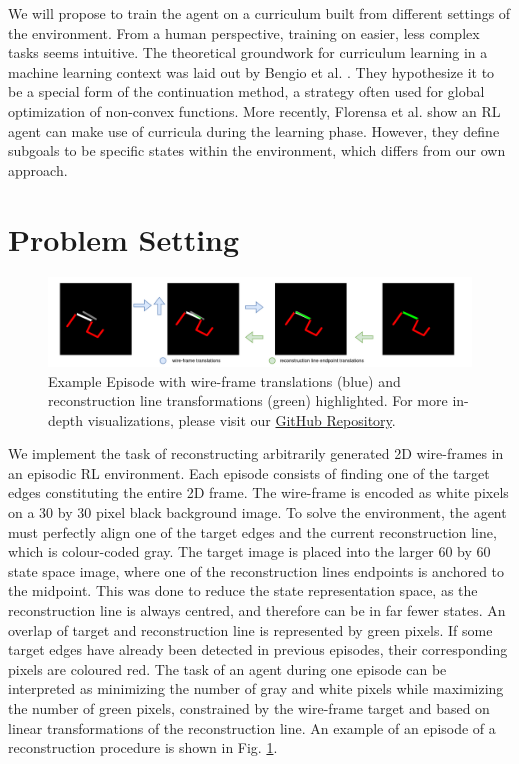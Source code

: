 \documentclass[11pt]{article} %
\begin{document}
We will propose to train the agent on a curriculum built from different settings of the environment. 
From a human perspective, training on easier, less complex tasks seems intuitive. 
The theoretical groundwork for curriculum learning in a machine learning context was laid out by Bengio et al. \cite{bengio-curriculum}. They hypothesize it to be a special form of the continuation method, a strategy often used for global optimization of non-convex functions.
More recently, Florensa et al. \cite{florensa_reverse_2018} show an RL agent can make use of curricula during the learning phase.
However, they define subgoals to be specific states within the environment, which differs from our own approach.
\section{Problem Setting}

\begin{figure}[h!]
    \centering
    \includegraphics[width=\textwidth]{figures/eps_multi.png}
    
\caption{Example Episode with wire-frame translations (blue) and reconstruction line transformations (green) highlighted. For more in-depth visualizations, please visit our \protect\href{https://github.com/juliantziegler/RL_Wire-Frame_Reconstruction}{GitHub Repository}.}

    \label{fig:fatm_plots}
\end{figure}

We implement the task of reconstructing arbitrarily generated 2D wire-frames in an episodic RL environment.
Each episode consists of finding one of the target edges constituting the entire 2D frame.
The wire-frame is encoded as white pixels on a 30 by 30 pixel black background image. 
To solve the environment, the agent must perfectly align one of the target edges and the current reconstruction line, which is colour-coded gray.
The target image is placed into the larger 60 by 60 state space image, where one of the reconstruction lines endpoints is anchored to the midpoint.
This was done to reduce the state representation space, as the reconstruction line is always centred, and therefore can be in far fewer states.
An overlap of target and reconstruction line is represented by green pixels. If some target edges have already been detected in previous episodes, their corresponding pixels are coloured red. The task of an agent during one episode can be interpreted as minimizing the number of gray and white pixels while maximizing the number of green pixels, constrained by the wire-frame target and based on linear transformations of the reconstruction line. An example of an episode of a reconstruction procedure is shown in Fig. \ref{fig:fatm_plots}.
\end{document}
